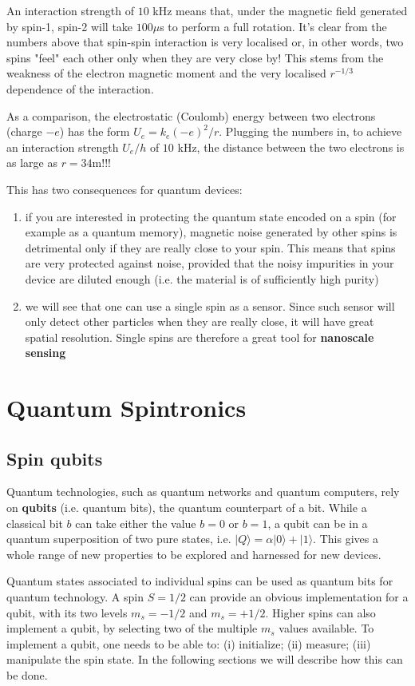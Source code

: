 \documentclass[a4paper,11pt]{article}
\newcommand{\ket}[1]{| #1 \rangle}
\begin{document}
An interaction strength of $10$ kHz means that, under the magnetic field generated by spin-1, spin-2 will take $100 \mu$s to perform a full rotation. It's clear from the numbers above that spin-spin interaction is very localised or, in other words, two spins "feel" each other only when they are very close by! This stems from the weakness of the electron magnetic moment and the very localised $r^{-1/3}$ dependence of the interaction.

As a comparison, the electrostatic (Coulomb) energy between two electrons (charge $-e$) has the form $U_e = k_e (-e)^2/r$. Plugging the numbers in, to achieve an interaction strength $U_e/h$ of $10$ kHz, the distance between the two electrons is as large as $r = 34$m!!!

This has two consequences for quantum devices:
\begin{enumerate}
    \item if you are interested in protecting the quantum state encoded on a spin (for example as a quantum memory), magnetic noise generated by other spins is detrimental only if they are really close to your spin. This means that spins are very protected against noise, provided that the noisy impurities in your device are diluted enough (i.e. the material is of sufficiently high purity)
    \item we will see that one can use a single spin as a sensor. Since such sensor will only detect other particles when they are really close, it will have great spatial resolution. Single spins are therefore a great tool for {\bf nanoscale sensing}
\end{enumerate}


\section {Quantum Spintronics}

\subsection {Spin qubits}
Quantum technologies, such as quantum networks and quantum computers, rely on {\bf qubits} (i.e. quantum bits), the quantum counterpart of a bit. While a classical bit $b$ can take either the value $b=0$ or $b=1$, a qubit can be in a quantum superposition of two pure states, i.e. $\ket{Q} = \alpha \ket{0} + \ket{1}$. This gives a whole range of new properties to be explored and harnessed for new devices. 

Quantum states associated to individual spins can be used as quantum bits for quantum technology. A spin $S=1/2$ can provide an obvious implementation for a qubit, with its two levels $m_s=-1/2$ and $m_s = +1/2$. Higher spins can also implement a qubit, by selecting two of the multiple $m_s$ values available. To implement a qubit, one needs to be able to: (i) initialize; (ii) measure; (iii) manipulate the spin state. In the following sections we will describe how this can be done.
\end{document}
